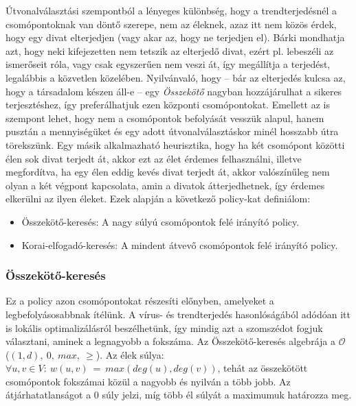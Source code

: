    Útvonalválasztási szempontból a lényeges különbség, hogy a trendterjedésnél a csomópontoknak van döntő szerepe, nem az éleknek, azaz itt nem közös érdek, hogy egy divat elterjedjen (vagy akar az, hogy ne terjedjen el). Bárki mondhatja azt, hogy neki kifejezetten nem tetszik az elterjedő divat, ezért pl. lebeszéli az ismerőseit róla, vagy csak egyszerűen nem veszi át, így megállítja a terjedést, legalábbis a közvetlen közelében. Nyilvánvaló, hogy -- bár az elterjedés kulcsa az, hogy a társadalom készen áll-e -- egy \emph{Összekötő} nagyban hozzájárulhat a sikeres terjesztéshez, így preferálhatjuk ezen központi csomópontokat. Emellett az is szempont lehet, hogy nem a csomópontok befolyását vesszük alapul, hanem pusztán a mennyiségüket és egy adott útvonalválasztáskor minél hosszabb útra törekszünk. Egy másik alkalmazható heurisztika, hogy ha két csomópont közötti élen sok divat terjedt át, akkor ezt az élet érdemes felhasználni, illetve megfordítva, ha egy élen eddig kevés divat terjedt át, akkor valószínűleg nem olyan a két végpont kapcsolata, amin a divatok átterjedhetnek, így érdemes elkerülni az ilyen éleket. Ezek alapján a következő policy-kat definiálom:

    \begin{itemize}
      \item Összekötő-keresés: A nagy súlyú csomópontok felé irányító policy.
      \item Korai-elfogadó-keresés: A mindent átvevő csomópontok felé irányító policy.
    \end{itemize}

      \subsubsection{Összekötő-keresés}\label{osszekoto_kereses}

      Ez a policy azon csomópontokat részesíti előnyben, amelyeket a legbefolyásosabbnak ítélünk. A vírus- és trendterjedés hasonlóságából adódóan itt is lokális optimalizálásról beszélhetünk, így mindig azt a szomszédot fogjuk választani, aminek a legnagyobb a fokszáma. Az Összekötő-keresés algebrája a $\mathcal{O}$ ($(1,d),~0,~max,~\geq$). Az élek súlya:
      $\forall u,v \in V:~w(u,v)~=~max(deg(u),deg(v))$, tehát az összekötött csomópontok fokszámai közül a nagyobb és nyilván a több jobb. Az átjárhatatlanságot a 0 súly jelzi, míg több él súlyát a maximumuk határozza meg.

